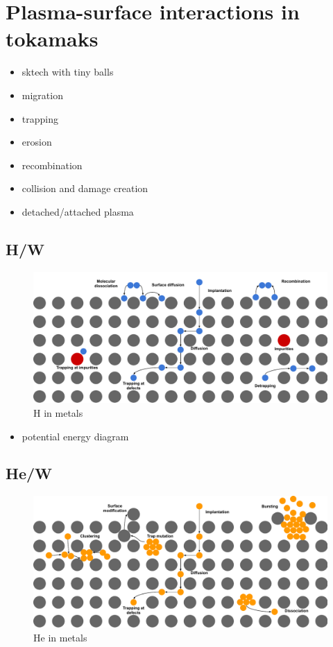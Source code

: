 \section{Plasma-surface interactions in tokamaks}

\begin{itemize}
    \item sktech with tiny balls
    \item migration
    \item trapping
    \item erosion
    \item recombination
    \item collision and damage creation
    \item detached/attached plasma
\end{itemize}


\subsection{H/W}
\begin{figure}
    \includegraphics[width=\linewidth]{Figures/Chapter1/HI transport sketch.pdf}
    \caption{H in metals}
\end{figure}

\begin{itemize}
    \item potential energy diagram
\end{itemize}
\subsection{He/W}

\begin{figure}
    \includegraphics[width=\linewidth]{Figures/Chapter1/He transport sketch.pdf}
    \caption{He in metals}
\end{figure}


